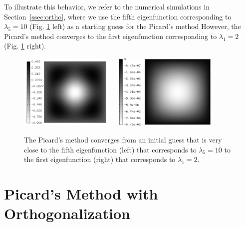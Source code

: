\documentclass[preprint,12pt]{elsarticle}
\begin{document}
To illustrate this behavior, we refer to the numerical simulations in Section~\ref{ssec:ortho}, where we use the fifth eigenfunction corresponding to $\lambda_5 = 10$ (Fig. \ref{fig:picard} left) as a starting guess for the Picard's method
However, the Picard's method converges to the first eigenfunction corresponding 
to $\lambda_1 = 2$ (Fig. \ref{fig:picard} right).

\newpage

\begin{figure}[!ht]
\begin{center}
\includegraphics[width=0.4\textwidth]{img/eigen_5_ex.png}\ \ \ 
\includegraphics[width=0.433\textwidth]{img/eigen-new-1.png}
\end{center}
\vspace{-5mm}
\caption{The Picard's method converges from an initial guess that is very close to 
         the fifth eigenfunction (left) that corresponds to $\lambda_5 = 10$ to the 
         first eigenfunction (right) that corresponds to $\lambda_1 = 2$.}
\label{fig:picard}
\end{figure}


\section{Picard's Method with Orthogonalization}\label{sec:picard++}
\end{document}
